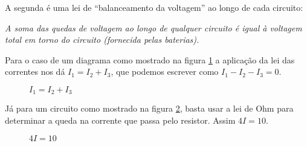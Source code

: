 A segunda é uma lei de ``balanceamento da voltagem'' ao longo de cada circuito:

\begin{tcolorbox}[colback=green!30, colframe=green!80!blue, title=Lei da Voltagem (circuitos)]
    \textit{A soma das quedas de voltagem ao longo de qualquer circuito é igual à voltagem total em torno do circuito (fornecida pelas baterias).}
\end{tcolorbox}

Para o caso de um diagrama como mostrado na figura \ref{correntedividindo} a aplicação da lei das correntes nos dá $I_1 = I_2 + I_3$, que podemos escrever como $I_1 - I_2 - I_3 = 0$.
\begin{figure}[!h]
    \centering
    
    \caption{$I_1 = I_2 + I_3$}
    \label{correntedividindo}
\end{figure}

Já para um circuito como mostrado na figura \ref{circuitocomumrsistor}, basta usar a lei de Ohm para determinar a queda na corrente que passa pelo resistor. Assim $4I = 10$.
\begin{figure}[!h]
    \centering
    
    \caption{$4I = 10$}
    \label{circuitocomumrsistor}
\end{figure}

